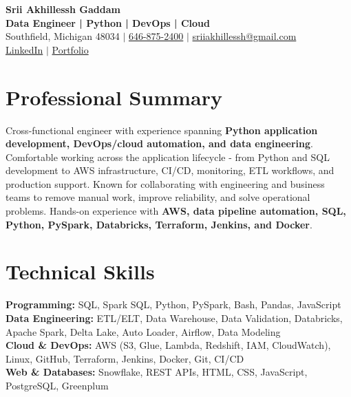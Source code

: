 \documentclass[letterpaper,10pt]{article}
\begin{document}
\fontsize{9.35pt}{10.45pt}\selectfont

\begin{center}
    {\LARGE \textbf{Srii Akhillessh Gaddam}} \\[-1pt]
    \textbf{Data Engineer | Python | DevOps | Cloud} \\[2pt]
    Southfield, Michigan 48034 $|$
    \href{tel:6468752400}{646-875-2400} $|$
    \href{mailto:sriiakhillessh@gmail.com}{sriiakhillessh@gmail.com} \\[1pt]
    \href{https://www.linkedin.com/in/srii-akhiilessh-gaddam-b48668191/}{LinkedIn} $|$
    \href{https://sriiakhillesshg.github.io/portfolio/}{Portfolio}
\end{center}
\vspace{-8pt}

\section{Professional Summary}
\small{Cross-functional engineer with experience spanning \textbf{Python application development, DevOps/cloud automation, and data engineering}. Comfortable working across the application lifecycle - from Python and SQL development to AWS infrastructure, CI/CD, monitoring, ETL workflows, and production support. Known for collaborating with engineering and business teams to remove manual work, improve reliability, and solve operational problems. Hands-on experience with \textbf{AWS, data pipeline automation, SQL, Python, PySpark, Databricks, Terraform, Jenkins, and Docker}.}

\section{Technical Skills}
\small{
\textbf{Programming:} SQL, Spark SQL, Python, PySpark, Bash, Pandas, JavaScript \\
\textbf{Data Engineering:} ETL/ELT, Data Warehouse, Data Validation, Databricks, Apache Spark, Delta Lake, Auto Loader, Airflow, Data Modeling \\
\textbf{Cloud \& DevOps:} AWS (S3, Glue, Lambda, Redshift, IAM, CloudWatch), Linux, GitHub, Terraform, Jenkins, Docker, Git, CI/CD \\
\textbf{Web \& Databases:} Snowflake, REST APIs, HTML, CSS, JavaScript, PostgreSQL, Greenplum
}
\end{document}
